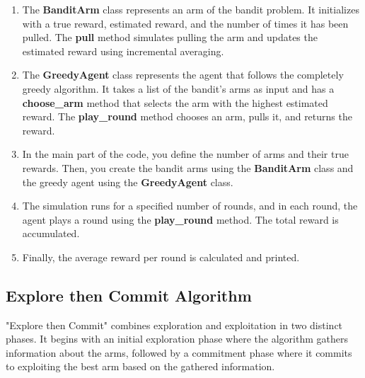 \documentclass{article}
\begin{document}
\begin{enumerate}
    \item The \textbf{BanditArm} class represents an arm of the bandit problem. It initializes with a true reward, estimated reward, and the number of times it has been pulled. The \textbf{pull} method simulates pulling the arm and updates the estimated reward using incremental averaging.
    
    \item The \textbf{GreedyAgent} class represents the agent that follows the completely greedy algorithm. It takes a list of the bandit's arms as input and has a \textbf{choose\_arm} method that selects the arm with the highest estimated reward. The \textbf{play\_round} method chooses an arm, pulls it, and returns the reward.

    \item In the main part of the code, you define the number of arms and their true rewards. Then, you create the bandit arms using the \textbf{BanditArm} class and the greedy agent using the \textbf{GreedyAgent} class.

    \item The simulation runs for a specified number of rounds, and in each round, the agent plays a round using the \textbf{play\_round} method. The total reward is accumulated.

    \item Finally, the average reward per round is calculated and printed.
\end{enumerate}


\subsection{Explore then Commit Algorithm}
 "Explore then Commit"  combines exploration and exploitation in two distinct phases. It begins with an initial exploration phase where the algorithm gathers information about the arms, followed by a commitment phase where it commits to exploiting the best arm based on the gathered information.
\end{document}
